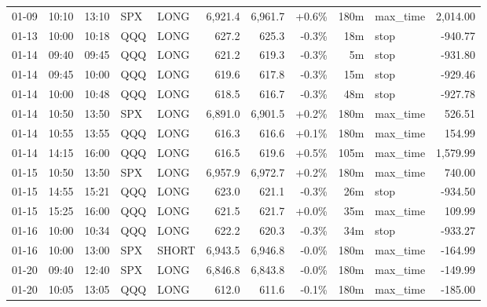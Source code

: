 \documentclass[11pt,a4paper,twoside]{article}
\begin{document}
\begin{center}
\begin{longtable}{>{\color{txtmain}}l l l l l r r r r >{\color{txtmain}}l r}
01-09 & 10:10 & 13:10 & SPX & LONG & 6,921.4 & 6,961.7 & \textcolor{wingreen}{+0.6\%} & 180m & max\_time & \textcolor{wingreen}{2,014.00} \\
01-13 & 10:00 & 10:18 & QQQ & LONG & 627.2 & 625.3 & \textcolor{lossred}{-0.3\%} & 18m & stop & \textcolor{lossred}{-940.77} \\
01-14 & 09:40 & 09:45 & QQQ & LONG & 621.2 & 619.3 & \textcolor{lossred}{-0.3\%} & 5m & stop & \textcolor{lossred}{-931.80} \\
01-14 & 09:45 & 10:00 & QQQ & LONG & 619.6 & 617.8 & \textcolor{lossred}{-0.3\%} & 15m & stop & \textcolor{lossred}{-929.46} \\
01-14 & 10:00 & 10:48 & QQQ & LONG & 618.5 & 616.7 & \textcolor{lossred}{-0.3\%} & 48m & stop & \textcolor{lossred}{-927.78} \\
01-14 & 10:50 & 13:50 & SPX & LONG & 6,891.0 & 6,901.5 & \textcolor{wingreen}{+0.2\%} & 180m & max\_time & \textcolor{wingreen}{526.51} \\
01-14 & 10:55 & 13:55 & QQQ & LONG & 616.3 & 616.6 & \textcolor{wingreen}{+0.1\%} & 180m & max\_time & \textcolor{wingreen}{154.99} \\
01-14 & 14:15 & 16:00 & QQQ & LONG & 616.5 & 619.6 & \textcolor{wingreen}{+0.5\%} & 105m & max\_time & \textcolor{wingreen}{1,579.99} \\
01-15 & 10:50 & 13:50 & SPX & LONG & 6,957.9 & 6,972.7 & \textcolor{wingreen}{+0.2\%} & 180m & max\_time & \textcolor{wingreen}{740.00} \\
01-15 & 14:55 & 15:21 & QQQ & LONG & 623.0 & 621.1 & \textcolor{lossred}{-0.3\%} & 26m & stop & \textcolor{lossred}{-934.50} \\
01-15 & 15:25 & 16:00 & QQQ & LONG & 621.5 & 621.7 & \textcolor{wingreen}{+0.0\%} & 35m & max\_time & \textcolor{wingreen}{109.99} \\
01-16 & 10:00 & 10:34 & QQQ & LONG & 622.2 & 620.3 & \textcolor{lossred}{-0.3\%} & 34m & stop & \textcolor{lossred}{-933.27} \\
01-16 & 10:00 & 13:00 & SPX & SHORT & 6,943.5 & 6,946.8 & \textcolor{lossred}{-0.0\%} & 180m & max\_time & \textcolor{lossred}{-164.99} \\
01-20 & 09:40 & 12:40 & SPX & LONG & 6,846.8 & 6,843.8 & \textcolor{lossred}{-0.0\%} & 180m & max\_time & \textcolor{lossred}{-149.99} \\
01-20 & 10:05 & 13:05 & QQQ & LONG & 612.0 & 611.6 & \textcolor{lossred}{-0.1\%} & 180m & max\_time & \textcolor{lossred}{-185.00} \\

\end{longtable}
\end{center}
\end{document}
